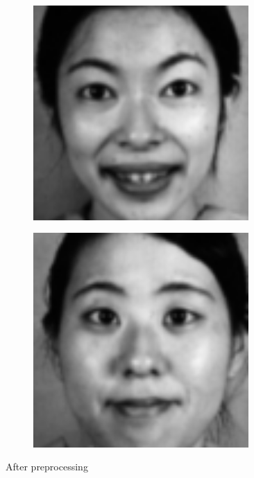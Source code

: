 \documentclass[a4paper, 12pt]{article}
\begin{document}
\begin{figure}[H]
	\centering
	\begin{subfigure}[b]{0.4\textwidth}
		\includegraphics[width=0.9\textwidth]{./processed/img1.png}
	\end{subfigure}
	\begin{subfigure}[b]{0.4\textwidth}
		\includegraphics[width=0.9\textwidth]{./processed/img2.png}
	\end{subfigure}
	\caption[]{After preprocessing}
	\label{fig:afterpre}
\end{figure}
	
\end{document}
